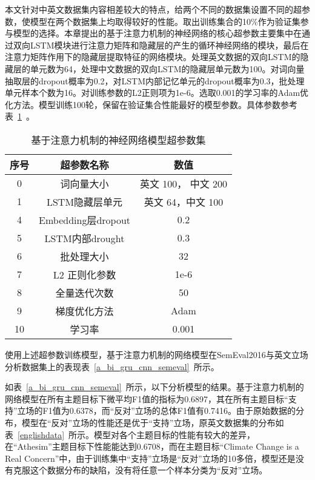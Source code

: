 本文针对中英文数据集内容相差较大的特点，给两个不同的数据集设置不同的超参数，使模型在两个数据集上均取得较好的性能。取出训练集合的10\%作为验证集参与模型的选择。本章提出的基于注意力机制的神经网络的核心超参数主要集中在通过双向LSTM模块进行注意力矩阵和隐藏层的产生的循环神经网络的模块，最后在注意力矩阵作用下的隐藏层提取特征的网络模块。处理英文数据的双向LSTM的隐藏层的单元数为64，处理中文数据的双向LSTM的隐藏层单元数为100。对词向量抽取层的dropout概率为0.2，对LSTM内部记忆单元的dropout概率为0.3，批处理单元样本个数为16。对训练参数的L2正则项为1e-6。选取0.001的学习率的Adam优化方法。模型训练100轮，保留在验证集合性能最好的模型参数。具体参数参考表~\ref{param1}~。
\begin{table}[htbp]
	\caption[param]{基于注意力机制的神经网络模型超参数集}
	\label{param1}
	\vspace{0.5em}\centering\wuhao
	\begin{tabular}{ccc}
		\toprule[1.5pt]
		序号& 超参数名称 &数值\\
		\midrule[1pt]
		0 &词向量大小& 英文 100， 中文 200\\
		1 &LSTM隐藏层单元& 英文 64，中文 100\\
		4 &Embedding层dropout& 0.2\\
		5 &LSTM内部drought& 0.3\\
		6 &批处理大小& 32\\
		7 &L2 正则化参数 &1e-6\\
		8 &全量迭代次数& 50\\
		9 &梯度优化方法& Adam\\
		10 &学习率& 0.001\\
		\bottomrule[1.5pt]
	\end{tabular}
\end{table}
使用上述超参数训练模型，基于注意力机制的网络模型在SemEval2016与英文立场分析数据集上的表现表~\ref{a_bi_gru_cnn_semeval}~所示。

如表~\ref{a_bi_gru_cnn_semeval}~所示，以下分析模型的结果。基于注意力机制的网络模型在所有主题目标下微平均F1值的指标为0.6897，其在所有主题目标“支持”立场的F1值为0.6378，而“反对”立场的总体F1值有0.7416。由于原始数据的分布，模型在“反对”立场的性能还是优于“支持”立场，原英文数据集的分布如表~\ref{englishdata}~所示。模型对各个主题目标的性能有较大的差异，在“Athesim”主题目标下性能能达到0.6708，而在主题目标“Climate Change is a Real Concern”中，由于训练集中“支持”立场是“反对”立场的10多倍，模型还是没有克服这个数据分布的缺陷，没有将任意一个样本分类为“反对”立场。

